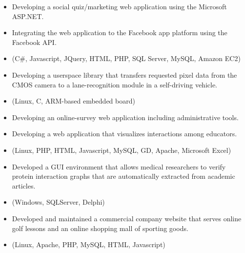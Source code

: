 \begin{itemize}
     \item{Developing a social quiz/marketing web application using the Microsoft ASP.NET.}
     \item{Integrating the web application to the Facebook app platform using the Facebook API.}
     \item{\small(C\#, Javascript, JQuery, HTML, PHP, SQL Server, MySQL, Amazon EC2)}
\end{itemize}

\begin{itemize}
 \item {Developing a userspace library that transfers requested pixel data from the CMOS camera
           to a lane-recognition module in a self-driving vehicle.}
 \item{\small(Linux, C, ARM-based embedded board)}
\end{itemize}

  \begin{itemize}
     \item{Developing an online-survey web application including administrative tools.}
     \item{Developing a web application that visualizes interactions among educators.}
     \item{\small(Linux, PHP, HTML, Javascript, MySQL, GD, Apache, Microsoft Excel)}
  \end{itemize}

\begin{itemize}
 \item {Developed a GUI environment that allows medical researchers to verify protein interaction graphs
          that are automatically extracted from academic articles.}
 \item{\small(Windows, SQLServer, Delphi)}
\end{itemize}

    
\begin{itemize}
 \item{Developed and maintained a commercial company website that 
          serves online golf lessons and an online shopping mall of sporting goods.}
 \item{\small(Linux, Apache, PHP, MySQL, HTML, Javascript)}
\end{itemize}
